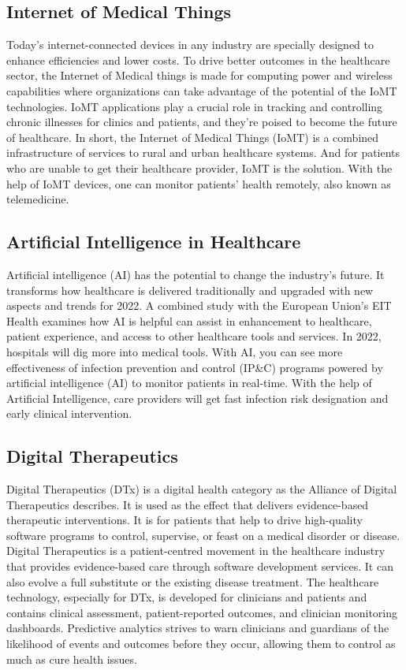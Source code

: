 \documentclass[12pt]{article}
\begin{document}
\subsection{Internet of Medical Things}
Today's internet-connected devices in any industry are specially designed to enhance efficiencies and lower costs. To drive better outcomes in the healthcare sector, the Internet of Medical things is made for computing power and wireless capabilities where organizations can take advantage of the potential of the IoMT technologies.
IoMT applications play a crucial role in tracking and controlling chronic illnesses for clinics and patients, and they're poised to become the future of healthcare.
In short, the Internet of Medical Things (IoMT) is a combined infrastructure of services to rural and urban healthcare systems. And for patients who are unable to get their healthcare provider, IoMT is the solution.
With the help of IoMT devices, one can monitor patients' health remotely, also known as telemedicine.

\subsection{Artificial Intelligence in Healthcare}
Artificial intelligence (AI) has the potential to change the industry's future. It transforms how healthcare is delivered traditionally and upgraded with new aspects and trends for 2022.
A combined study with the European Union's EIT Health examines how AI is helpful can assist in enhancement to healthcare, patient experience, and access to other healthcare tools and services.
In 2022, hospitals will dig more into medical tools. With AI, you can see more effectiveness of infection prevention and control (IP&C) programs powered by artificial intelligence (AI) to monitor patients in real-time. With the help of Artificial Intelligence, care providers will get fast infection risk designation and early clinical intervention.
\subsection{Digital Therapeutics}
Digital Therapeutics (DTx) is a digital health category as the Alliance of Digital Therapeutics describes. It is used as the effect that delivers evidence-based therapeutic interventions. It is for patients that help to drive high-quality software programs to control, supervise, or feast on a medical disorder or disease.
Digital Therapeutics is a patient-centred movement in the healthcare industry that provides evidence-based care through software development services. It can also evolve a full substitute or the existing disease treatment.
The healthcare technology, especially for DTx, is developed for clinicians and patients and contains clinical assessment, patient-reported outcomes, and clinician monitoring dashboards.
Predictive analytics strives to warn clinicians and guardians of the likelihood of events and outcomes before they occur, allowing them to control as much as cure health issues.
\end{document}
